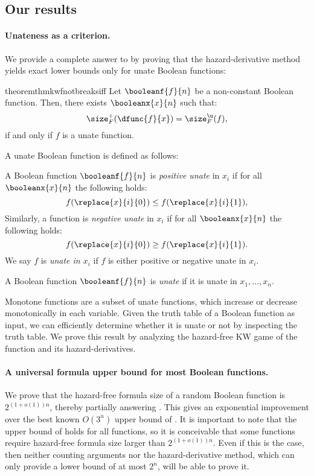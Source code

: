 \documentclass[acmsmall, nonacm, authorversion]{acmart}
\begin{document}
\subsection{Our results}
\paragraph{Unateness as a criterion.}
We provide a complete answer to  by proving that the hazard-derivative method yields exact lower bounds only for unate Boolean functions:
\begin{restatable}{theorem}{thmkwfnotbreaksiff}\label{thm:kw-f-not-breaks-if}
Let $\booleanf{f}{n}$ be a non-constant Boolean function. Then, there exists $\booleanx{x}{n}$ such that:
\[
    \size_{F}^{+}(\dfunc{f}{x}) = \size_{F}^{\u}(f),
\]
if and only if $f$ is a unate function.
\end{restatable}
A unate Boolean function is defined as follows:
\begin{definition}\label{def:unate-function-xi}
A Boolean function $\booleanf{f}{n}$ is \emph{positive unate} in $x_i$ if for all $\booleanx{x}{n}$ the following holds:
\[
f(\replace{x}{i}{0}) \le f(\replace{x}{i}{1}),
\]
Similarly, a function is \emph{negative unate} in $x_i$ if for all $\booleanx{x}{n}$ the following holds:
\[
f(\replace{x}{i}{0}) \ge f(\replace{x}{i}{1}).
\]
We say $f$ is \emph{unate in $x_i$} if $f$ is either positive or negative unate in $x_i$.
\end{definition}

\begin{definition}\label{def:unate-function}
A Boolean function $\booleanf{f}{n}$ is \emph{unate} if it is unate in $x_1,\dots,x_n$.
\end{definition}

Monotone functions are a subset of unate functions, which  increase or decrease monotonically in each variable. Given the truth table of a Boolean function as input, we can efficiently determine whether it is unate or not by inspecting the truth table. We prove this result by analyzing the hazard-free KW game of the function and its hazard-derivatives.

\paragraph{A universal formula upper bound for most Boolean functions.} 
We prove that the hazard-free formula size of a random Boolean function is $2^{(1+o(1))n}$, thereby partially answering . This gives an exponential improvement over the best known $O(3^n)$ upper bound of \cite{IK23}. It is important to note that the upper bound of \cite{IK23} holds for all functions, so it is conceivable that some functions require hazard-free formula size larger than $2^{(1+o(1))n}$. Even if this is the case, then neither counting arguments nor the hazard-derivative method, which can only provide a lower bound of at most $2^n$, will be able to prove it.
\end{document}
